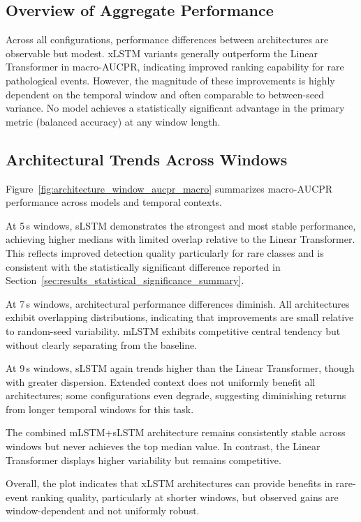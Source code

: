 \subsection{Overview of Aggregate Performance}

Across all configurations, performance differences between architectures are
observable but modest. \ac{xLSTM} variants generally outperform the Linear
Transformer in macro-\ac{AUCPR}, indicating improved ranking capability for rare
pathological events. However, the magnitude of these improvements is highly
dependent on the temporal window and often comparable to between-seed variance.
No model achieves a statistically significant advantage in the primary metric
(balanced accuracy) at any window length.

\subsection{Architectural Trends Across Windows}

Figure~\ref{fig:architecture_window_aucpr_macro} summarizes macro-\ac{AUCPR}
performance across models and temporal contexts.

At 5\,s windows, \ac{sLSTM} demonstrates the strongest and most stable
performance, achieving higher medians with limited overlap relative to the
Linear Transformer. This reflects improved detection quality particularly for
rare classes and is consistent with the statistically significant difference
reported in Section~\ref{sec:results_statistical_significance_summary}.

At 7\,s windows, architectural performance differences diminish. All
architectures exhibit overlapping distributions, indicating that improvements
are small relative to random-seed variability. \ac{mLSTM} exhibits competitive
central tendency but without clearly separating from the baseline.

At 9\,s windows, \ac{sLSTM} again trends higher than the Linear Transformer,
though with greater dispersion. Extended context does not uniformly benefit all
architectures; some configurations even degrade, suggesting diminishing returns
from longer temporal windows for this task.

The combined \ac{mLSTM}+\ac{sLSTM} architecture remains consistently stable
across windows but never achieves the top median value. In contrast, the Linear
Transformer displays higher variability but remains competitive.

Overall, the plot indicates that \ac{xLSTM} architectures can provide benefits
in rare-event ranking quality, particularly at shorter windows, but observed
gains are window-dependent and not uniformly robust.

